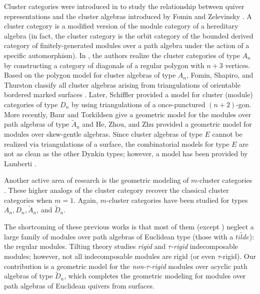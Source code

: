 \documentclass[11pt]{amsart}
\theoremstyle{plain}
\theoremstyle{definition}
\numberwithin{equation}{section}
\begin{document}
Cluster categories were introduced in \cite{buan_cluster-tilted_2007,buan_cluster_2008,buan_tilting_2006} to study the relationship between quiver representations and the cluster algebras introduced by Fomin and Zelevinsky \cite{fomin_cluster_2002,fomin_cluster_2003}.
A cluster category is a modified version of the module category of a hereditary algebra (in fact, the cluster category is the orbit category of the bounded derived category of finitely-generated modules over a path algebra under the action of a specific automorphism).
In \cite{caldero_quivers_2006}, the authors realize the cluster categories of type $A_n$ by constructing a category of diagonals of a regular polygon with $n+3$ vertices.
Based on the polygon model for cluster algebras of type $A_n$, Fomin, Shapiro, and Thurston classify all cluster algebras arising from triangulations of orientable bordered marked surfaces \cite{fomin_cluster_2008}.
Later, Schiffler \cite{schiffler_geometric_2008} provided a model for cluster (module) categories of type $D_n$ by using triangulations of a once-punctured $(n+2)$-gon.
More recently, Baur and Torkildsen \cite{baur_geometric_2015} give a geometric model for the modules over path algebras of type $\widetilde{A}_n$ and He, Zhou, and Zhu \cite{he_mutation_2022,he_geometric_2023} provided a geometric model for modules over skew-gentle algebras. 
Since cluster algebras of type $E$ cannot be realized via triangulations of a surface, the combinatorial models for type $E$ are not as clean as the other Dynkin types; however, a model has been provided by Lamberti \cite{lamberti_combinatorial_2015}.

Another active area of research is the geometric modeling of $m$-cluster categories
\cite{jacquet-malo_geometric_2025,torkildsen_geometric_2015,zhou_cluster_2009}.
These higher analogs of the cluster category recover the classical cluster categories when $m=1$.
Again, $m$-cluster categories have been studied for types $A_n, D_n, \widetilde{A}_n$, and $\widetilde{D}_n$.

The shortcoming of these previous works is that most of them (except \cite{baur_geometric_2015}) neglect a large family of modules over path algebras of Euclidean type (those with a $\widetilde{tilde}$): the regular modules.
Tilting theory studies \textit{rigid} and \textit{$\tau$-rigid} indecomposable modules; however, not all indecomposable modules are rigid (or even $\tau$-rigid).
Our contribution is a geometric model for the \textit{non-$\tau$-rigid} modules over acyclic path algebras of type $\widetilde{D}_n$, which completes the geometric modeling for modules over path algebras of Euclidean quivers from surfaces.
\end{document}
